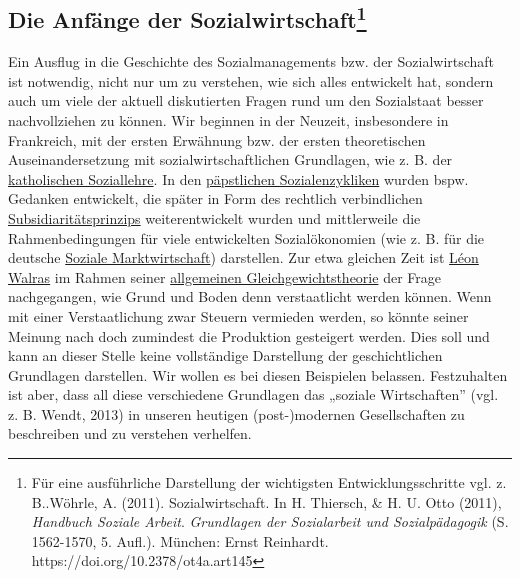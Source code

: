 \documentclass[
  letterpaper,
]{book}
\begin{document}
\subsection[Die Anfänge der Sozialwirtschaft]{\texorpdfstring{Die
Anfänge der
Sozialwirtschaft\footnote{Für eine ausführliche Darstellung der
  wichtigsten Entwicklungsschritte vgl. z. B..Wöhrle, A. (2011).
  Sozialwirtschaft. In H. Thiersch, \& H. U. Otto (2011), \emph{Handbuch
  Soziale Arbeit}. \emph{Grundlagen der Sozialarbeit und
  Sozialpädagogik} (S. 1562-1570, 5. Aufl.). München: Ernst Reinhardt.
  https://doi.org/10.2378/ot4a.art145}}{Die Anfänge der Sozialwirtschaft}}\label{die-anfaenge-der-sozialwirtschaft}

Ein Ausflug in die Geschichte des Sozialmanagements bzw. der
Sozialwirtschaft ist notwendig, nicht nur um zu verstehen, wie sich
alles entwickelt hat, sondern auch um viele der aktuell diskutierten
Fragen rund um den Sozialstaat besser nachvollziehen zu können. Wir
beginnen in der Neuzeit, insbesondere in Frankreich, mit der ersten
Erwähnung bzw. der ersten theoretischen Auseinandersetzung mit
sozialwirtschaftlichen Grundlagen, wie z. B. der
\href{https://de.wikipedia.org/wiki/Katholische_Soziallehre}{katholischen
Soziallehre}. In den
\href{https://de.wikipedia.org/wiki/Sozialenzyklika}{päpstlichen
Sozialenzykliken} wurden bspw. Gedanken entwickelt, die später in Form
des rechtlich verbindlichen
\href{https://www.bpb.de/kurz-knapp/lexika/pocket-europa/16951/subsidiaritaetsprinzip/}{Subsidiaritätsprinzips}
weiterentwickelt wurden und mittlerweile die Rahmenbedingungen für viele
entwickelten Sozialökonomien (wie z. B. für die deutsche
\href{https://www.bpb.de/kurz-knapp/lexika/lexikon-der-wirtschaft/20642/soziale-marktwirtschaft/}{Soziale
Marktwirtschaft}) darstellen. Zur etwa gleichen Zeit ist
\href{https://de.wikipedia.org/wiki/L\%C3\%A9on_Walras}{Léon Walras} im
Rahmen seiner
\href{https://de.wikipedia.org/wiki/Walrasianisches_allgemeines_Gleichgewichtsmodell}{allgemeinen
Gleichgewichtstheorie} der Frage nachgegangen, wie Grund und Boden denn
verstaatlicht werden können. Wenn mit einer Verstaatlichung zwar Steuern
vermieden werden, so könnte seiner Meinung nach doch zumindest die
Produktion gesteigert werden. Dies soll und kann an dieser Stelle keine
vollständige Darstellung der geschichtlichen Grundlagen darstellen. Wir
wollen es bei diesen Beispielen belassen. Festzuhalten ist aber, dass
all diese verschiedene Grundlagen das „soziale Wirtschaften'' (vgl. z.
B. Wendt, 2013) in unseren heutigen (post-)modernen Gesellschaften zu
beschreiben und zu verstehen verhelfen.
\end{document}

